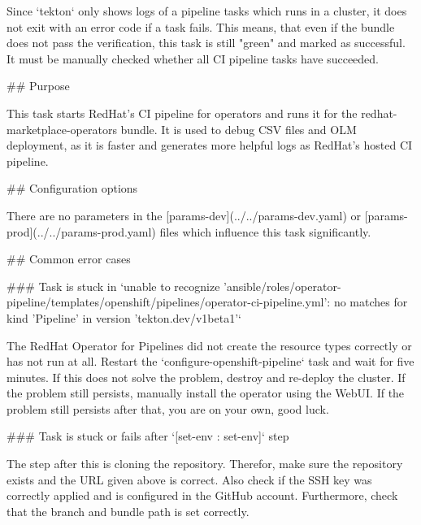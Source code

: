 Since `tekton` only shows logs of a pipeline tasks which runs in a cluster, it does not exit with an error code if a task fails.
This means, that even if the bundle does not pass the verification, this task is still "green" and marked as successful.
It must be manually checked whether all CI pipeline tasks have succeeded.

## Purpose

This task starts RedHat's CI pipeline for operators and runs it for the redhat-marketplace-operators bundle.
It is used to debug CSV files and OLM deployment, as it is faster and generates more helpful logs as RedHat's hosted CI pipeline.

## Configuration options

There are no parameters in the [params-dev](../../params-dev.yaml) or [params-prod](../../params-prod.yaml) files which influence this task significantly.

## Common error cases

### Task is stuck in `unable to recognize 'ansible/roles/operator-pipeline/templates/openshift/pipelines/operator-ci-pipeline.yml': no matches for kind 'Pipeline' in version 'tekton.dev/v1beta1'`

The RedHat Operator for Pipelines did not create the resource types correctly or has not run at all.
Restart the `configure-openshift-pipeline` task and wait for five minutes.
If this does not solve the problem, destroy and re-deploy the cluster.
If the problem still persists, manually install the operator using the WebUI.
If the problem still persists after that, you are on your own, good luck.

### Task is stuck or fails after `[set-env : set-env]` step

The step after this is cloning the repository.
Therefor, make sure the repository exists and the URL given above is correct.
Also check if the SSH key was correctly applied and is configured in the GitHub account.
Furthermore, check that the branch and bundle path is set correctly.
